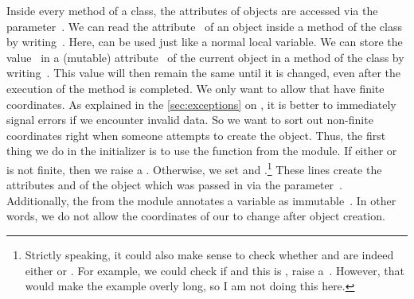 Inside every method of a class, the attributes of objects are accessed via the parameter~.
We can read the attribute~ of an object inside a method of the class by writing~.
Here,  can be used just like a normal local variable.
We can store the value~ in a (mutable) attribute~ of the current object in a method of the class by writing~.
This value will then remain the same until it is changed, even after the execution of the method is completed.%
%
%
We only want to allow  that have finite coordinates.
As explained in the \cref{sec:exceptions} on , it is better to immediately signal errors if we encounter invalid data.
So we want to sort out non-finite coordinates right when someone attempts to create the  object.
Thus, the first thing we do in the initializer is to use the  function from the  module.
If either  or  is not finite, then we raise a .
Otherwise, we set  and .\footnote{%
Strictly speaking, it could also make sense to check whether  and  are indeed either  or . %
For example, we could check if  and this is , raise a~. %
However, that would make the example overly long, so I am not doing this here.%
}
These lines create the attributes  and  of the object which was passed in via the parameter~.
Additionally, the   from the  module annotates a variable as immutable~\cite{PEP591}.
In other words, we do not allow the coordinates of our  to change after object creation.%
%
%
%
%
